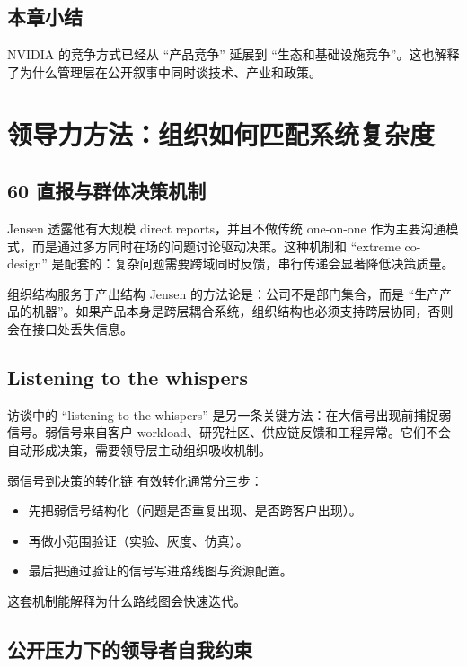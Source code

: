 \documentclass[a4paper]{article}
\begin{document}
\subsection{本章小结}

NVIDIA 的竞争方式已经从 ``产品竞争'' 延展到 ``生态和基础设施竞争''。这也解释了为什么管理层在公开叙事中同时谈技术、产业和政策。

\section{领导力方法：组织如何匹配系统复杂度}

\subsection{60 直报与群体决策机制}

Jensen 透露他有大规模 direct reports，并且不做传统 one-on-one 作为主要沟通模式，而是通过多方同时在场的问题讨论驱动决策。这种机制和 ``extreme co-design'' 是配套的：复杂问题需要跨域同时反馈，串行传递会显著降低决策质量。

\begin{importantbox}{组织结构服务于产出结构}
Jensen 的方法论是：公司不是部门集合，而是 ``生产产品的机器''。如果产品本身是跨层耦合系统，组织结构也必须支持跨层协同，否则会在接口处丢失信息。
\end{importantbox}

\subsection{Listening to the whispers}

访谈中的 ``listening to the whispers'' 是另一条关键方法：在大信号出现前捕捉弱信号。弱信号来自客户 workload、研究社区、供应链反馈和工程异常。它们不会自动形成决策，需要领导层主动组织吸收机制。

\begin{knowledgebox}{弱信号到决策的转化链}
有效转化通常分三步：
\begin{itemize}
    \item 先把弱信号结构化（问题是否重复出现、是否跨客户出现）。
    \item 再做小范围验证（实验、灰度、仿真）。
    \item 最后把通过验证的信号写进路线图与资源配置。
\end{itemize}
这套机制能解释为什么路线图会快速迭代。
\end{knowledgebox}

\subsection{公开压力下的领导者自我约束}
\end{document}
